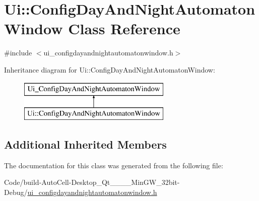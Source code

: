 \hypertarget{class_ui_1_1_config_day_and_night_automaton_window}{}\section{Ui\+:\+:Config\+Day\+And\+Night\+Automaton\+Window Class Reference}
\label{class_ui_1_1_config_day_and_night_automaton_window}


{\ttfamily \#include $<$ui\+\_\+configdayandnightautomatonwindow.\+h$>$}

Inheritance diagram for Ui\+:\+:Config\+Day\+And\+Night\+Automaton\+Window\+:\begin{figure}[H]
\begin{center}
\leavevmode
\includegraphics[height=2.000000cm]{class_ui_1_1_config_day_and_night_automaton_window}
\end{center}
\end{figure}
\subsection*{Additional Inherited Members}


The documentation for this class was generated from the following file\+:\begin{DoxyCompactItemize}
\item 
Code/build-\/\+Auto\+Cell-\/\+Desktop\+\_\+\+Qt\+\_\+\_\+\_\+\_\+\+Min\+G\+W\+\_\+32bit-\/\+Debug/\mbox{\hyperlink{ui__configdayandnightautomatonwindow_8h}{ui\+\_\+configdayandnightautomatonwindow.\+h}}\end{DoxyCompactItemize}
